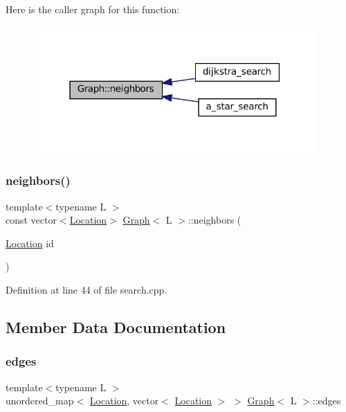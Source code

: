 Here is the caller graph for this function\+:\nopagebreak
\begin{figure}[H]
\begin{center}
\leavevmode
\includegraphics[width=307pt]{struct_graph_a8389c308ee673e63d574e0a30191662e_icgraph}
\end{center}
\end{figure}
\mbox{\label{struct_graph_a8389c308ee673e63d574e0a30191662e}} 
\subsubsection{\texorpdfstring{neighbors()}{neighbors()}\hspace{0.1cm}{\footnotesize\ttfamily [2/2]}}
{\footnotesize\ttfamily template$<$typename L $>$ \\
const vector$<$\mbox{\hyperlink{struct_graph_aea7d42bb67163fe692353674435a1426}{Location}}$>$ \mbox{\hyperlink{struct_graph}{Graph}}$<$ L $>$\+::neighbors (\begin{DoxyParamCaption}\item[{\mbox{\hyperlink{struct_graph_aea7d42bb67163fe692353674435a1426}{Location}}}]{id }\end{DoxyParamCaption})\hspace{0.3cm}{\ttfamily [inline]}}



Definition at line 44 of file search.\+cpp.



\subsection{Member Data Documentation}
\mbox{\label{struct_graph_a8b01818e086835dc5d24ec4082afeef0}} 
\subsubsection{\texorpdfstring{edges}{edges}}
{\footnotesize\ttfamily template$<$typename L $>$ \\
unordered\+\_\+map$<$ \mbox{\hyperlink{struct_graph_aea7d42bb67163fe692353674435a1426}{Location}}, vector$<$ \mbox{\hyperlink{struct_graph_aea7d42bb67163fe692353674435a1426}{Location}} $>$ $>$ \mbox{\hyperlink{struct_graph}{Graph}}$<$ L $>$\+::edges}



